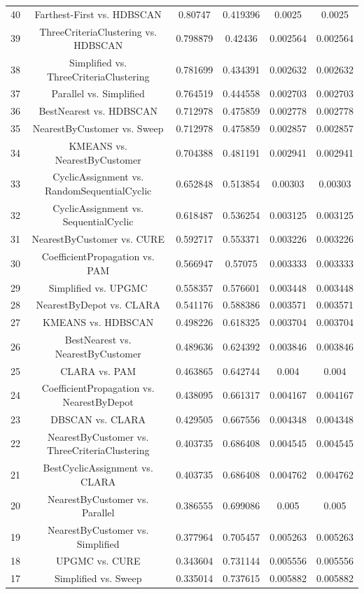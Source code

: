 \documentclass[a4paper,10pt]{article}
\begin{document}
\begin{landscape}
\begin{table}[!htp]
\begin{tabular}{cccccc}
40&Farthest-First vs. HDBSCAN&0.80747&0.419396&0.0025&0.0025\\
39&ThreeCriteriaClustering vs. HDBSCAN&0.798879&0.42436&0.002564&0.002564\\
38&Simplified vs. ThreeCriteriaClustering&0.781699&0.434391&0.002632&0.002632\\
37&Parallel vs. Simplified&0.764519&0.444558&0.002703&0.002703\\
36&BestNearest vs. HDBSCAN&0.712978&0.475859&0.002778&0.002778\\
35&NearestByCustomer vs. Sweep&0.712978&0.475859&0.002857&0.002857\\
34&KMEANS vs. NearestByCustomer&0.704388&0.481191&0.002941&0.002941\\
33&CyclicAssignment vs. RandomSequentialCyclic&0.652848&0.513854&0.00303&0.00303\\
32&CyclicAssignment vs. SequentialCyclic&0.618487&0.536254&0.003125&0.003125\\
31&NearestByCustomer vs. CURE&0.592717&0.553371&0.003226&0.003226\\
30&CoefficientPropagation vs. PAM&0.566947&0.57075&0.003333&0.003333\\
29&Simplified vs. UPGMC&0.558357&0.576601&0.003448&0.003448\\
28&NearestByDepot vs. CLARA&0.541176&0.588386&0.003571&0.003571\\
27&KMEANS vs. HDBSCAN&0.498226&0.618325&0.003704&0.003704\\
26&BestNearest vs. NearestByCustomer&0.489636&0.624392&0.003846&0.003846\\
25&CLARA vs. PAM&0.463865&0.642744&0.004&0.004\\
24&CoefficientPropagation vs. NearestByDepot&0.438095&0.661317&0.004167&0.004167\\
23&DBSCAN vs. CLARA&0.429505&0.667556&0.004348&0.004348\\
22&NearestByCustomer vs. ThreeCriteriaClustering&0.403735&0.686408&0.004545&0.004545\\
21&BestCyclicAssignment vs. CLARA&0.403735&0.686408&0.004762&0.004762\\
20&NearestByCustomer vs. Parallel&0.386555&0.699086&0.005&0.005\\
19&NearestByCustomer vs. Simplified&0.377964&0.705457&0.005263&0.005263\\
18&UPGMC vs. CURE&0.343604&0.731144&0.005556&0.005556\\
17&Simplified vs. Sweep&0.335014&0.737615&0.005882&0.005882\\

\end{tabular}
\end{table}
\end{landscape}
\end{document}
